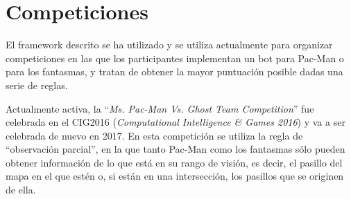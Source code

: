 \section{Competiciones}
El framework descrito se ha utilizado y se utiliza actualmente para organizar competiciones en las que los participantes implementan un bot para Pac-Man o para los fantasmas, y tratan de obtener la mayor puntuación posible dadas una serie de reglas.
 
Actualmente activa, la ``\textit{Ms. Pac-Man Vs. Ghost Team Competition}'' fue celebrada en el CIG2016\cite{CIG2016Page} (\textit{Computational Intelligence \& Games 2016}) y va a ser celebrada de nuevo en 2017. En esta competición se utiliza la regla de ``observación parcial'', en la que tanto Pac-Man como los fantasmas sólo pueden obtener información de lo que está en su rango de visión, es decir, el pasillo del mapa en el que estén o, si están en una intersección, los pasillos que se originen de ella.
